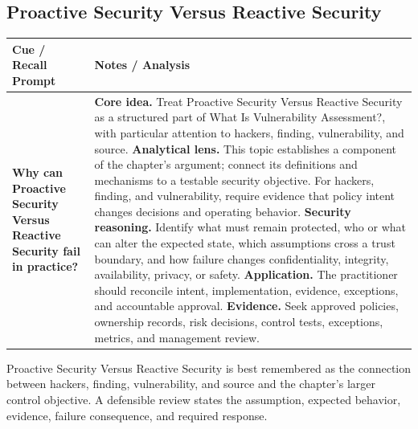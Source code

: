 \documentclass[11pt]{article}
\newcommand{\CornellHeader}{%
\rowcolor{Navy}\color{white}\bfseries Cue / Recall Prompt & \color{white}\bfseries Notes / Analysis\\\hline}
\newcommand{\CornellRow}[2]{%
\cellcolor{CueGray}\RaggedRight\textbf{#1} & \RaggedRight #2\\\hline}
\begin{document}
\subsection*{Proactive Security Versus Reactive Security}
\begin{longtable}{>{\RaggedRight\arraybackslash}p{}|>{\RaggedRight\arraybackslash}p{}}
\CornellHeader
\CornellRow{Why can Proactive Security Versus Reactive Security fail in practice?}{\textbf{Core idea.} Treat Proactive Security Versus Reactive Security as a structured part of What Is Vulnerability Assessment?, with particular attention to hackers, finding, vulnerability, and source. \textbf{Analytical lens.} This topic establishes a component of the chapter's argument; connect its definitions and mechanisms to a testable security objective. For hackers, finding, and vulnerability, require evidence that policy intent changes decisions and operating behavior. \textbf{Security reasoning.} Identify what must remain protected, who or what can alter the expected state, which assumptions cross a trust boundary, and how failure changes confidentiality, integrity, availability, privacy, or safety. \textbf{Application.} The practitioner should reconcile intent, implementation, evidence, exceptions, and accountable approval. \textbf{Evidence.} Seek approved policies, ownership records, risk decisions, control tests, exceptions, metrics, and management review.}
\end{longtable}
\begin{topicsummary}
Proactive Security Versus Reactive Security is best remembered as the connection between hackers, finding, vulnerability, and source and the chapter's larger control objective. A defensible review states the assumption, expected behavior, evidence, failure consequence, and required response.
\end{topicsummary}
\end{document}
